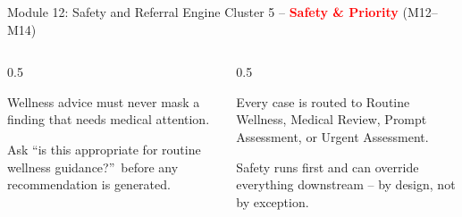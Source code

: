 \documentclass[9pt,aspectratio=169]{beamer}
\begin{document}
\begin{frame}{Module 12: Safety and Referral Engine}
\textcolor{black!55}{\scriptsize Cluster 5 -- \textcolor{red}{\textbf{Safety \& Priority}} (M12--M14)}\\[2pt]
\begin{columns}[T,onlytextwidth]
\begin{column}{0.5\textwidth}
\begin{tcolorbox}[colback=blue!7,colframe=blue!55!black,title=\textbf{Motivation},boxrule=0.6pt,arc=1mm,left=5pt,right=5pt,top=3pt,bottom=3pt,fonttitle=\small]
\footnotesize Wellness advice must never mask a finding that needs medical attention.
\end{tcolorbox}
\vspace{5pt}
\begin{tcolorbox}[colback=teal!7,colframe=teal!55!black,title=\textbf{Method},boxrule=0.6pt,arc=1mm,left=5pt,right=5pt,top=3pt,bottom=3pt,fonttitle=\small]
\footnotesize Ask \textquotedblleft is this appropriate for routine wellness guidance?\textquotedblright\ before any recommendation is generated.
\end{tcolorbox}
\end{column}
\begin{column}{0.5\textwidth}
\begin{tcolorbox}[colback=green!8,colframe=green!45!black,title=\textbf{Result},boxrule=0.6pt,arc=1mm,left=5pt,right=5pt,top=3pt,bottom=3pt,fonttitle=\small]
\footnotesize Every case is routed to Routine Wellness, Medical Review, Prompt Assessment, or Urgent Assessment.
\end{tcolorbox}
\vspace{5pt}
\begin{tcolorbox}[colback=orange!10,colframe=orange!65!black,title=\textbf{Conclusion},boxrule=0.6pt,arc=1mm,left=5pt,right=5pt,top=3pt,bottom=3pt,fonttitle=\small]
\footnotesize Safety runs first and can override everything downstream -- by design, not by exception.
\end{tcolorbox}
\end{column}
\end{columns}
\end{frame}
\end{document}
